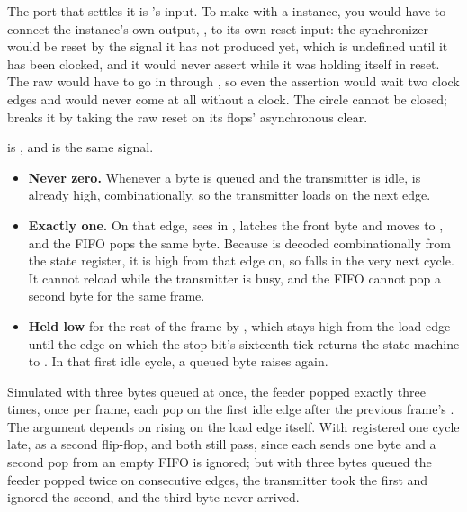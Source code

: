  The port that settles it is 's  input. To make
 with a  instance, you would have to connect the instance's own output,
, to its own reset input: the synchronizer would be reset by the signal it has not
produced yet, which is undefined until it has been clocked, and it would never assert while it was
holding itself in reset. The raw  would have to go in through , so even
the assertion would wait two clock edges and would never come at all without a clock. The circle
cannot be closed;  breaks it by taking the raw reset on its flops' asynchronous
clear.

  is , and  is the same
signal.
\begin{itemize}
  \item \textbf{Never zero.} Whenever a byte is queued and the transmitter is idle,  is
    already high, combinationally, so the transmitter loads on the next edge.
  \item \textbf{Exactly one.} On that edge,  sees  in ,
    latches the front byte and moves to , and the FIFO pops the same byte. Because
     is decoded combinationally from the state register, it is high from that edge on,
    so  falls in the very next cycle. It cannot reload while the transmitter is busy,
    and the FIFO cannot pop a second byte for the same frame.
  \item \textbf{Held low} for the rest of the frame by , which stays high from the
    load edge until the edge on which the stop bit's sixteenth tick returns the state machine to
    . In that first idle cycle, a queued byte raises  again.
\end{itemize}
Simulated with three bytes queued at once, the feeder popped exactly three times, once per frame,
each pop on the first idle edge after the previous frame's . The argument depends on
 rising on the load edge itself. With  registered one cycle late, as a second
flip-flop,  and  both still pass, since each sends one byte and a
second pop from an empty FIFO is ignored; but with three bytes queued the feeder popped twice on
consecutive edges, the transmitter took the first and ignored the second, and the third byte never
arrived.

